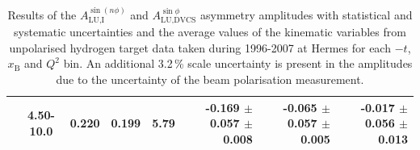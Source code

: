 \documentclass[11pt,a4paper]{article}
\begin{document}
\begin{table}[width=15cm]
\begin{center}
{\begin{tabular}{|c|c|c|c|c|r|r|r|}
& 4.50-10.0 &  0.220 & 0.199 &  5.79  &  -0.169 $\pm$ 0.057  $\pm$   0.008 &
-0.065  $\pm$  0.057 $\pm$ 0.005 & -0.017  $\pm$  0.056  $\pm$  0.013\\
\hline
  \end{tabular}
}
 \end{center}
\caption{Results of the $A_{\textrm{LU,I}}^{\sin(n\phi)}$ and
  $A_{\textrm{LU,DVCS}}^{\sin \phi}$ asymmetry amplitudes with
  statistical and systematic uncertainties and the average values of
  the kinematic variables from unpolarised hydrogen target data taken during 1996-2007 at H{\sc ermes} for each $-t$, $x_{\textrm{B}}$ and $Q^{2}$ bin.
An additional 3.2\,\% scale uncertainty is present in the amplitudes due to the uncertainty of the beam polarisation measurement.
}
\end{table}
\end{document}
